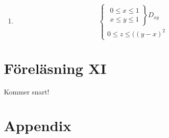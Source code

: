 \documentclass[a4paper]{article}
\begin{document}
\begin{enumerate}
\item 
$$
\begin{cases}
\left.\begin{array}{rcl}
0 \leq x \leq 1 \\
x \leq y \leq 1 \end{array}\right\}	D_{xy} \\
0 \leq z \leq ((y-x)^2
\end{cases}
$$
\end{enumerate}


\newpage
\section{Föreläsning XI}

Kommer snart!









\newpage
\fancyhf{}
\section{Appendix}
\begin{appendix}
	\listoffigures
	\listoftables
\end{appendix}
\end{document}
